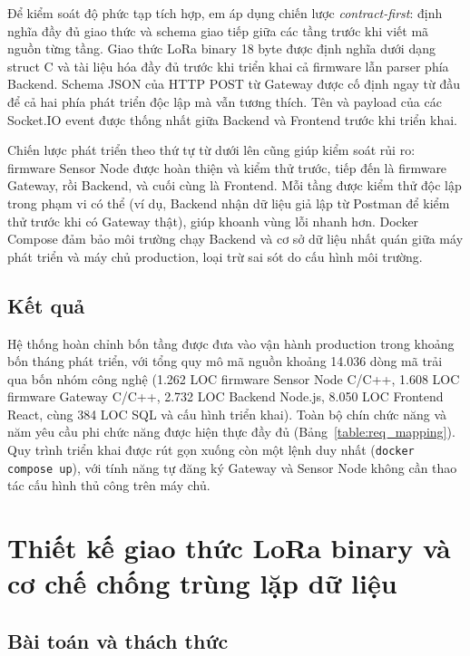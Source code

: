 \documentclass[../DoAn.tex]{subfiles}
\begin{document}
Để kiểm soát độ phức tạp tích hợp, em áp dụng chiến lược \textit{contract-first}: định nghĩa đầy đủ giao thức và schema giao tiếp giữa các tầng trước khi viết mã nguồn từng tầng. Giao thức LoRa binary 18 byte được định nghĩa dưới dạng struct C và tài liệu hóa đầy đủ trước khi triển khai cả firmware lẫn parser phía Backend. Schema \gls{JSON} của HTTP POST từ Gateway được cố định ngay từ đầu để cả hai phía phát triển độc lập mà vẫn tương thích. Tên và payload của các Socket.IO event được thống nhất giữa Backend và Frontend trước khi triển khai.

Chiến lược phát triển theo thứ tự từ dưới lên cũng giúp kiểm soát rủi ro: firmware Sensor Node được hoàn thiện và kiểm thử trước, tiếp đến là firmware Gateway, rồi Backend, và cuối cùng là Frontend. Mỗi tầng được kiểm thử độc lập trong phạm vi có thể (ví dụ, Backend nhận dữ liệu giả lập từ Postman để kiểm thử trước khi có Gateway thật), giúp khoanh vùng lỗi nhanh hơn. Docker Compose đảm bảo môi trường chạy Backend và cơ sở dữ liệu nhất quán giữa máy phát triển và máy chủ production, loại trừ sai sót do cấu hình môi trường.

\subsection{Kết quả}
\label{subsection:5.1.3}

Hệ thống hoàn chỉnh bốn tầng được đưa vào vận hành production trong khoảng bốn tháng phát triển, với tổng quy mô mã nguồn khoảng 14.036 dòng mã trải qua bốn nhóm công nghệ (1.262 LOC firmware Sensor Node C/C++, 1.608 LOC firmware Gateway C/C++, 2.732 LOC Backend Node.js, 8.050 LOC Frontend React, cùng 384 LOC SQL và cấu hình triển khai). Toàn bộ chín chức năng và năm yêu cầu phi chức năng được hiện thực đầy đủ (Bảng~\ref{table:req_mapping}). Quy trình triển khai được rút gọn xuống còn một lệnh duy nhất (\texttt{docker compose up}), với tính năng tự đăng ký Gateway và Sensor Node không cần thao tác cấu hình thủ công trên máy chủ.

\section{Thiết kế giao thức LoRa binary và cơ chế chống trùng lặp dữ liệu}
\label{section:5.2}

\subsection{Bài toán và thách thức}
\label{subsection:5.2.1}
\end{document}
